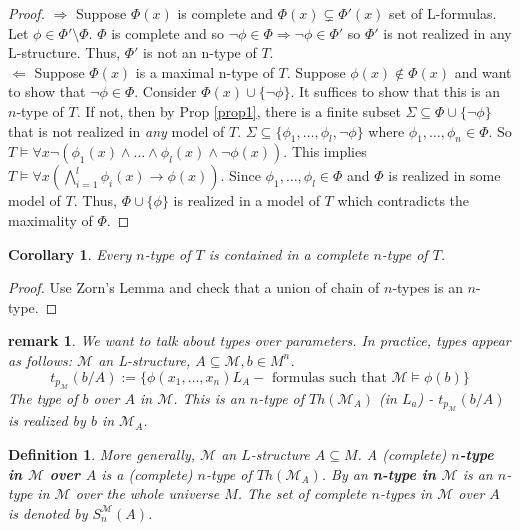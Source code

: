 \documentclass[letterpaper, 12pt]{article}
\newcommand{\fin}{\qquad \quad \hfill \framebox[1.75mm][l]{\,}}
\newcommand{\cM}{\mathcal{M}}
\theoremstyle{stdthm}
\newtheorem{cor}[thm]{Corollary}
\theoremstyle{stddef}
\newtheorem{defn}[thm]{Definition}
\newtheorem{rem}[thm]{remark} %
\theoremstyle{stdnonum}
\theoremstyle{stdqands}
\theoremstyle{stdbold}
\begin{document}
\begin{proof}
$\Rightarrow$ Suppose $\Phi(x)$ is complete and $\Phi(x) \subsetneq \Phi'(x)$ set of L-formulas. Let $\phi \in \Phi' \setminus \Phi$. $\Phi$ is complete and so $\neg \phi \in \Phi \Rightarrow \neg \phi \in \Phi'$ so $\Phi'$ is not realized in any L-structure. Thus, $\Phi'$ is not an n-type of $T$. \\

\noindent $\Leftarrow$ Suppose $\Phi(x)$ is a maximal n-type of $T$. Suppose $\phi(x) \notin \Phi(x)$ and want to show that $\neg \phi \in \Phi$. Consider $\Phi(x) \cup \{ \neg \phi\}$. It suffices to show that this is an $n$-type of $T$. If not, then by Prop \ref{prop1}, there is  a finite subset $\Sigma \subseteq \Phi \cup \{\neg \phi \}$ that is not realized in \emph{any} model of $T$. $\Sigma \subseteq \{\phi_1, \dots, \phi_l, \neg \phi\}$ where $\phi_1, \dots, \phi_n \in \Phi$. So $T \models \forall x \neg(\phi_1(x) \wedge \dots \wedge \phi_l(x) \wedge \neg \phi(x))$.   This implies $T \models \forall x\left( \bigwedge_{i=1}^l \phi_i(x) \to \phi(x)\right)$. Since $\phi_1,\dots, \phi_l \in \Phi$ and $\Phi$ is realized in some model of $T$. Thus, $\Phi \cup \{\phi\}$ is realized in a model of $T$ which contradicts the maximality of $\Phi$. 
\end{proof}

\begin{cor}
Every $n$-type of $T$ is contained in a complete $n$-type of $T$.
\end{cor}

\begin{proof}
Use Zorn's Lemma and check that a union of chain of $n$-types is an $n$-type. 
\end{proof}


\begin{rem}
We want to talk about types over parameters. In practice, types appear as follows: $\cM$ an L-structure, $A \subseteq \cM, b \in M^n$. 
\[ t_{p_\cM}(b/A) := \{\phi(x_1,\dots, x_n) L_A - \mbox{ formulas such that } \cM \models \phi(b) \}\] 
The type of $b$ over $A$ in $\cM$. This is an $n$-type of $Th(\cM_A)$ (in $L_a$) - $t_{p_\cM}(b/A)$ is realized by $b$ in $\cM_A$. 
\end{rem}

\begin{defn}
More generally, $\cM$ an $L$-structure $A\subseteq M$. A (complete) {\bf $n$-type in $\cM$ over $A$} is a (complete) $n$-type of $Th(\cM_A)$. By an {\bf n-type in $\cM$} is an $n$-type in $\cM$ over the whole universe $M$. The set of complete $n$-types in $\cM$ over $A$ is denoted by $S_n^{\cM}(A)$. 
\end{defn}
\end{document}
